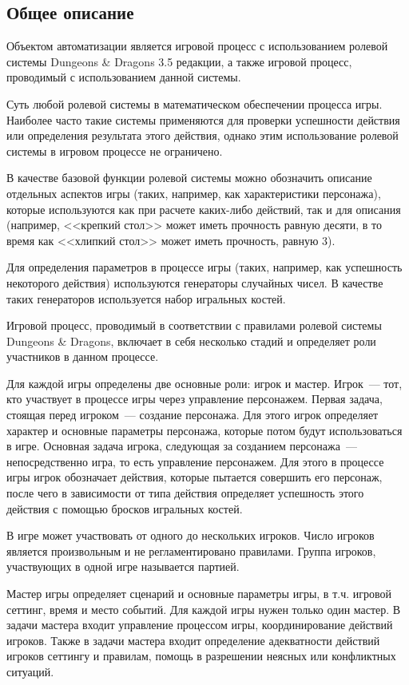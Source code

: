 \subsection{Общее описание}

Объектом автоматизации является игровой процесс с использованием ролевой системы Dungeons \& Dragons 3.5 редакции, а также игровой процесс, проводимый с использованием данной системы.

Суть любой ролевой системы в математическом обеспечении процесса игры. Наиболее часто такие системы применяются для проверки успешности действия или определения результата этого действия, однако этим использование ролевой системы в игровом процессе не ограничено.

В качестве базовой функции ролевой системы можно обозначить описание отдельных аспектов игры (таких, например, как характеристики персонажа), которые используются как при расчете каких-либо действий, так и для описания (например, <<крепкий стол>> может иметь прочность равную десяти, в то время как <<хлипкий стол>> может иметь прочность, равную 3).

Для определения параметров в процессе игры (таких, например, как успешность некоторого действия) используются генераторы случайных чисел. В качестве таких генераторов используется набор игральных костей.

Игровой процесс, проводимый в соответствии с правилами ролевой системы Dungeons \& Dragons, включает в себя несколько стадий и определяет роли участников в данном процессе.

Для каждой игры определены две основные роли: игрок и мастер. Игрок~--- тот, кто участвует в процессе игры через управление персонажем. Первая задача, стоящая перед игроком~--- создание персонажа. Для этого игрок определяет характер и основные параметры персонажа, которые потом будут использоваться в игре. Основная задача игрока, следующая за созданием персонажа~--- непосредственно игра, то есть управление персонажем. Для этого в процессе игры игрок обозначает действия, которые пытается совершить его персонаж, после чего в зависимости от типа действия определяет успешность этого действия с помощью бросков игральных костей.

В игре может участвовать от одного до нескольких игроков. Число игроков является произвольным и не регламентировано правилами. Группа игроков, участвующих в одной игре называется партией.

Мастер игры определяет сценарий и основные параметры игры, в т.ч. игровой сеттинг, время и место событий. Для каждой игры нужен только один мастер. В задачи мастера входит управление процессом игры, координирование действий игроков. Также в задачи мастера входит определение адекватности действий игроков сеттингу и правилам, помощь в разрешении неясных или конфликтных ситуаций.

